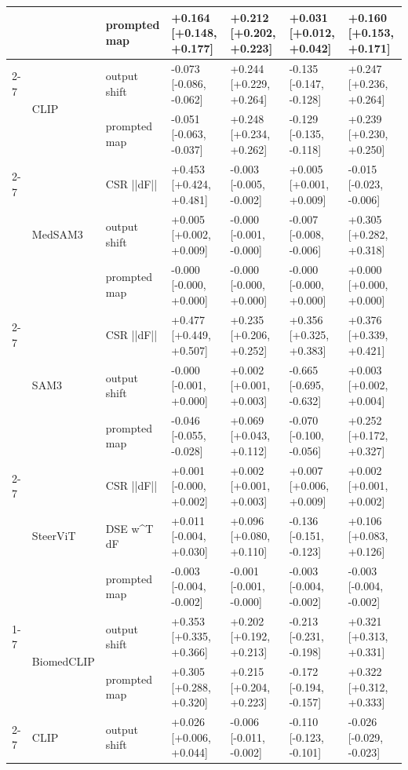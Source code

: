 \begin{tabular}{lllllll}
 &  & prompted map & +0.164 [+0.148, +0.177] & +0.212 [+0.202, +0.223] & +0.031 [+0.012, +0.042] & +0.160 [+0.153, +0.171] \\
\cline{2-7}
 & \multirow[t]{2}{*}{CLIP} & output shift & -0.073 [-0.086, -0.062] & +0.244 [+0.229, +0.264] & -0.135 [-0.147, -0.128] & +0.247 [+0.236, +0.264] \\
 &  & prompted map & -0.051 [-0.063, -0.037] & +0.248 [+0.234, +0.262] & -0.129 [-0.135, -0.118] & +0.239 [+0.230, +0.250] \\
\cline{2-7}
 & \multirow[t]{3}{*}{MedSAM3} & CSR  ||dF|| & +0.453 [+0.424, +0.481] & -0.003 [-0.005, -0.002] & +0.005 [+0.001, +0.009] & -0.015 [-0.023, -0.006] \\
 &  & output shift & +0.005 [+0.002, +0.009] & -0.000 [-0.001, -0.000] & -0.007 [-0.008, -0.006] & +0.305 [+0.282, +0.318] \\
 &  & prompted map & -0.000 [-0.000, +0.000] & -0.000 [-0.000, +0.000] & -0.000 [-0.000, +0.000] & +0.000 [+0.000, +0.000] \\
\cline{2-7}
 & \multirow[t]{3}{*}{SAM3} & CSR  ||dF|| & +0.477 [+0.449, +0.507] & +0.235 [+0.206, +0.252] & +0.356 [+0.325, +0.383] & +0.376 [+0.339, +0.421] \\
 &  & output shift & -0.000 [-0.001, +0.000] & +0.002 [+0.001, +0.003] & -0.665 [-0.695, -0.632] & +0.003 [+0.002, +0.004] \\
 &  & prompted map & -0.046 [-0.055, -0.028] & +0.069 [+0.043, +0.112] & -0.070 [-0.100, -0.056] & +0.252 [+0.172, +0.327] \\
\cline{2-7}
 & \multirow[t]{3}{*}{SteerViT} & CSR  ||dF|| & +0.001 [-0.000, +0.002] & +0.002 [+0.001, +0.003] & +0.007 [+0.006, +0.009] & +0.002 [+0.001, +0.002] \\
 &  & DSE  w^T dF & +0.011 [-0.004, +0.030] & +0.096 [+0.080, +0.110] & -0.136 [-0.151, -0.123] & +0.106 [+0.083, +0.126] \\
 &  & prompted map & -0.003 [-0.004, -0.002] & -0.001 [-0.001, -0.000] & -0.003 [-0.004, -0.002] & -0.003 [-0.004, -0.002] \\
\cline{1-7} \cline{2-7}
\multirow[t]{13}{*}{kvasir} & \multirow[t]{2}{*}{BiomedCLIP} & output shift & +0.353 [+0.335, +0.366] & +0.202 [+0.192, +0.213] & -0.213 [-0.231, -0.198] & +0.321 [+0.313, +0.331] \\
 &  & prompted map & +0.305 [+0.288, +0.320] & +0.215 [+0.204, +0.223] & -0.172 [-0.194, -0.157] & +0.322 [+0.312, +0.333] \\
\cline{2-7}
 & \multirow[t]{2}{*}{CLIP} & output shift & +0.026 [+0.006, +0.044] & -0.006 [-0.011, -0.002] & -0.110 [-0.123, -0.101] & -0.026 [-0.029, -0.023] \\

\end{tabular}
